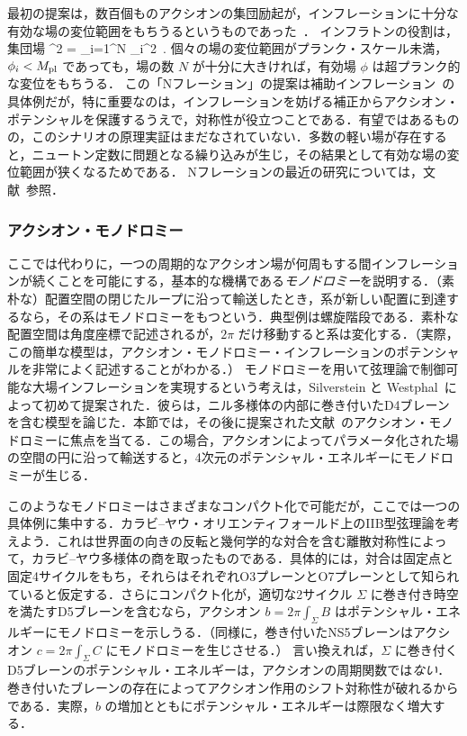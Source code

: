 最初の提案は，数百個ものアクシオンの集団励起が，インフレーションに十分な有効な場の変位範囲をもちうるというものであった~\cite{Nflation, Easther:2005zr}．
インフラトンの役割は，集団場
\beq
\phi^2 = \sum_{i=1}^N \phi_i^2\, .
\eeq
個々の場の変位範囲がプランク・スケール未満，$\phi_i < M_{\rm pl}$ であっても，場の数 $N$ が十分に大きければ，有効場 $\phi$ は超プランク的な変位をもちうる．
この「Nフレーション」の提案は補助インフレーション~\cite{Liddle:1998jc}の具体例だが，特に重要なのは，インフレーションを妨げる補正からアクシオン・ポテンシャルを保護するうえで，対称性が役立つことである．有望ではあるものの，このシナリオの原理実証はまだなされていない．多数の軽い場が存在すると，ニュートン定数に問題となる繰り込みが生じ，その結果として有効な場の変位範囲が狭くなるためである．
Nフレーションの最近の研究については，文献~\cite{Kallosh:2007cc, Grimm:2007hs}参照．


\subsubsection*{アクシオン・モノドロミー}

ここでは代わりに，一つの周期的なアクシオン場が何周もする間インフレーションが続くことを可能にする，基本的な機構である{\it{モノドロミー}}を説明する．（素朴な）配置空間の閉じたループに沿って輸送したとき，系が新しい配置に到達するなら，その系はモノドロミーをもつという．典型例は螺旋階段である．素朴な配置空間は角度座標で記述されるが，$2\pi$ だけ移動すると系は変化する．（実際，この簡単な模型は，アクシオン・モノドロミー・インフレーションのポテンシャルを非常によく記述することがわかる．）
モノドロミーを用いて弦理論で制御可能な大場インフレーションを実現するという考えは，Silverstein と Westphal~\cite{Silverstein:2008sg}によって初めて提案された．彼らは，ニル多様体の内部に巻き付いたD4ブレーンを含む模型を論じた．本節では，その後に提案された文献~\cite{MSW}のアクシオン・モノドロミーに焦点を当てる．この場合，アクシオンによってパラメータ化された場の空間の円に沿って輸送すると，4次元のポテンシャル・エネルギーにモノドロミーが生じる．

このようなモノドロミーはさまざまなコンパクト化で可能だが，ここでは一つの具体例に集中する．カラビ--ヤウ・オリエンティフォールド上のIIB型弦理論を考えよう．これは世界面の向きの反転と幾何学的な対合を含む離散対称性によって，カラビ--ヤウ多様体の商を取ったものである．具体的には，対合は固定点と固定4サイクルをもち，それらはそれぞれO3プレーンとO7プレーンとして知られていると仮定する．さらにコンパクト化が，適切な2サイクル $\Sigma$ に巻き付き時空を満たすD5ブレーンを含むなら，アクシオン $b=2\pi \int_{\Sigma}B$ はポテンシャル・エネルギーにモノドロミーを示しうる．（同様に，巻き付いたNS5ブレーンはアクシオン $c=2\pi \int_{\Sigma}C$ にモノドロミーを生じさせる．）
言い換えれば，$\Sigma$ に巻き付くD5ブレーンのポテンシャル・エネルギーは，アクシオンの周期関数では{\it ない}．巻き付いたブレーンの存在によってアクシオン作用のシフト対称性が破れるからである．実際，$b$ の増加とともにポテンシャル・エネルギーは際限なく増大する．

